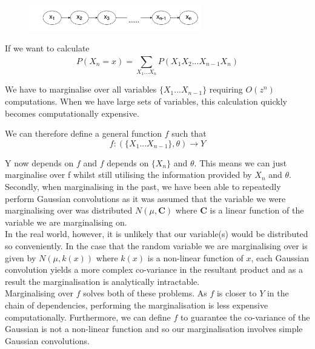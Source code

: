 \documentclass[10pt, a4paper, twocolumn]{article} %
\begin{document}
\begin{enumerate}
  \begin{figure}[H]
      \centering
      \includegraphics[width=75mm,scale=0.5]{images/q20.png}
      \label{fig:Q20_graph_1}
  \end{figure}
 
  If we want to calculate 
  \begin{equation} 
    P(X_{n} = x) = \sum_{X_{1}...X_{n}}^{} P(X_{1}X_{2}...X_{n-1}X_{n}) 
  \end{equation}
  
  We have to marginalise over all variables $\{{X_{1}...X_{n-1}\}}$ requiring $O(z^n)$ computations. When we have large sets of variables, this calculation quickly becomes computationally expensive.
  
   We can therefore define a general function $f$ such that
   \begin{equation}
    f: \left(\{{X_{1}...X_{n-1}\}} , \theta \right)       \xrightarrow{} Y
   \end{equation}
   
   Y now depends on $f$ and $f$ depends on $\{X_{n}\}$ and $\theta$. This means we can just marginalise over f whilst still utilising the information provided by ${X_n}$ and $\theta$.\\
   
   Secondly, when marginalising in the past, we have been able to repeatedly perform Gaussian convolutions as it was assumed that the variable we were marginalising over was distributed $N(\mu,\mathbf{C})$ where $\mathbf{C}$ is a linear function of the variable we are marginalising on.\\
   
   In the real world, however, it is unlikely that our variable(s) would be distributed so conveniently. In the case that the random variable we are marginalising over is given by $N(\mu, k(x))$ where $k(x)$ is a non-linear function of $x$, each Gaussian convolution yields a more complex co-variance in the resultant product and as a result the marginalisation is analytically intractable.\\
   
   Marginalising over $f$ solves both of these problems. As $f$ is closer to $Y$ in the chain of dependencies, performing the marginalisation is less expensive computationally. Furthermore, we can define $f$ to guarantee the co-variance of the Gaussian is not a non-linear function and so our marginalisation involves simple Gaussian convolutions.\\    


\end{enumerate}
\end{document}

